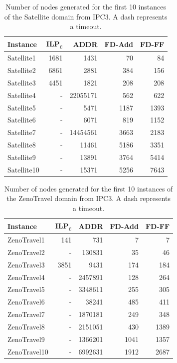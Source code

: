 \begin{table}[p]
    \centering
    \begin{tabular}{lrrrr}
        \hline
        \textbf{Instance} & \textbf{ILP\textsubscript{c}} & \textbf{ADDR} & \textbf{FD-Add} & \textbf{FD-FF} \\ 
        \hline
        Satellite1 & 1681 & 1431 & 70 & 84 \\ 
        Satellite2 & 6861 & 2881 & 384 & 156 \\ 
        Satellite3 & 4451 & 1821 & 208 & 208 \\
        Satellite4 & - & 22055171 & 562 & 622 \\ 
        Satellite5 & - & 5471 & 1187 & 1393 \\ 
        Satellite6 & - & 6071 & 819 & 1152 \\ 
        Satellite7 & - & 14454561 & 3663 & 2183 \\
        Satellite8 & - & 11461 & 5186 & 3351 \\ 
        Satellite9 & - & 13891 & 3764 & 5414 \\
        Satellite10 & - & 15371 & 5256 & 7643 \\
        \hline
    \end{tabular}
    \caption{Number of nodes generated for the first 10 instances of the Satellite domain from IPC3. A dash represents a timeout.}
    \label{fig:satelliteNodes}
\end{table}


\begin{table}[p]
    \centering
    \begin{tabular}{lrrrr}
        \hline
        \textbf{Instance} & \textbf{ILP\textsubscript{c}} & \textbf{ADDR} & \textbf{FD-Add} & \textbf{FD-FF} \\ 
        \hline
        ZenoTravel1 & 141 & 731 & 7 & 7 \\
        ZenoTravel2 & - & 130831 & 35 & 46 \\
        ZenoTravel3 & 3851 & 9431 & 174 & 184 \\ 
        ZenoTravel4 & - & 2457891 & 128 & 264 \\
        ZenoTravel5 & - & 3348611 & 255 & 305 \\ 
        ZenoTravel6 & - & 38241 & 485 & 411 \\
        ZenoTravel7 & - & 1870181 & 249 & 348 \\ 
        ZenoTravel8 & - & 2151051 & 430 & 1389 \\ 
        ZenoTravel9 & - & 1366201 & 1041 & 1357 \\ 
        ZenoTravel10 & - & 6992631 & 1912 & 2687 \\
        \hline
    \end{tabular}
    \caption{Number of nodes generated for the first 10 instances of the ZenoTravel domain from IPC3. A dash represents a timeout.}
    \label{fig:zenoTravelNodes}
\end{table}


